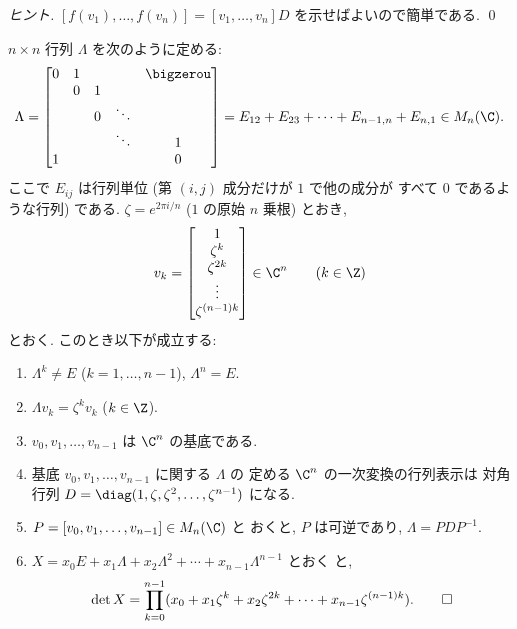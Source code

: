 \documentclass[12pt,twoside]{jarticle}
\begin{document}
\begin{proof}[ヒント]
  $[f(v_1),\ldots,f(v_n)]=[v_1,\ldots,v_n]D$ を示せばよいので簡単である.
  \qed
\end{proof}


\begin{question}[巡回行列とその行列式, 20点]
  $n\times n$ 行列 $\Lambda$ を次のように定める:
  \begin{equation*}
    \Lambda = 
    \begin{bmatrix}
      0 & 1 &   & & \bigzerou \\
        & 0 & 1 & & \\
        &   & 0 & \ddots & \\
        &   &   & \ddots & 1 \\
      1 &   &   &        & 0 \\
    \end{bmatrix}
    =
    E_{12} + E_{23} + \cdots + E_{n-1,n} + E_{n,1}
    \in M_n(\C).
  \end{equation*}
  ここで $E_{ij}$ は行列単位 (第 $(i,j)$ 成分だけが $1$ で他の成分が
  すべて $0$ であるような行列) である.
  $\zeta = e^{2\pi i/n}$ ($1$ の原始 $n$ 乗根) とおき,
  \begin{equation*}
    v_k =
    \begin{bmatrix}
      1 \\ \zeta^k \\ \zeta^{2k} \\ \vdots \\ \zeta^{(n-1)k} \\
    \end{bmatrix}
    \in \C^n
    \qquad (k\in\Z)
  \end{equation*}
  とおく.  このとき以下が成立する:
  \begin{enumerate}
  \item $\Lambda^k\ne E$ ($k=1,\ldots,n-1$), $\Lambda^n=E$.
  \item $\Lambda v_k = \zeta^k v_k$ ($k\in\Z$).
  \item $v_0,v_1,\ldots,v_{n-1}$ は $\C^n$ の基底である.
  \item 基底 $v_0,v_1,\ldots,v_{n-1}$ に関する $\Lambda$ の
    定める $\C^n$ の一次変換の行列表示は
    対角行列 $D=\diag(1,\zeta,\zeta^2,\ldots,\zeta^{n-1})$ になる.
  \item $P=[v_0,v_1,\ldots,v_{n-1}]\in M_n(\C)$ と
    おくと, $P$ は可逆であり, $\Lambda = PDP^{-1}$.
  \item $X=x_0 E+x_1\Lambda+x_2\Lambda^2+\cdots+x_{n-1}\Lambda^{n-1}$ とおく
    と, 
    \begin{equation*}
      \det X = 
      \prod_{k=0}^{n-1}
      (x_0+x_1\zeta^k+x_2\zeta^{2k}+\cdots+x_{n-1}\zeta^{(n-1)k}).
      \qed
    \end{equation*}
  \end{enumerate}
\end{question}
\end{document}
